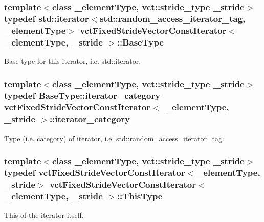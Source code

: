 \subsubsection[{Base\+Type}]{\setlength{\rightskip}{0pt plus 5cm}template$<$class \+\_\+element\+Type, vct\+::stride\+\_\+type \+\_\+stride$>$ typedef std\+::iterator$<$std\+::random\+\_\+access\+\_\+iterator\+\_\+tag, \+\_\+element\+Type$>$ {\bf vct\+Fixed\+Stride\+Vector\+Const\+Iterator}$<$ \+\_\+element\+Type, \+\_\+stride $>$\+::{\bf Base\+Type}}\label{classvct_fixed_stride_vector_const_iterator_ad92100e30e7cbc86c778a0a01a1d19e5}
Base type for this iterator, i.\+e. std\+::iterator. \hypertarget{classvct_fixed_stride_vector_const_iterator_adda9caa49222d747d94b783c74fb95eb}{}
\subsubsection[{iterator\+\_\+category}]{\setlength{\rightskip}{0pt plus 5cm}template$<$class \+\_\+element\+Type, vct\+::stride\+\_\+type \+\_\+stride$>$ typedef Base\+Type\+::iterator\+\_\+category {\bf vct\+Fixed\+Stride\+Vector\+Const\+Iterator}$<$ \+\_\+element\+Type, \+\_\+stride $>$\+::{\bf iterator\+\_\+category}}\label{classvct_fixed_stride_vector_const_iterator_adda9caa49222d747d94b783c74fb95eb}
Type (i.\+e. category) of iterator, i.\+e. std\+::random\+\_\+access\+\_\+iterator\+\_\+tag. \hypertarget{classvct_fixed_stride_vector_const_iterator_ac60fc9d8c2af56a7f251d9a7040efa1e}{}
\subsubsection[{This\+Type}]{\setlength{\rightskip}{0pt plus 5cm}template$<$class \+\_\+element\+Type, vct\+::stride\+\_\+type \+\_\+stride$>$ typedef {\bf vct\+Fixed\+Stride\+Vector\+Const\+Iterator}$<$\+\_\+element\+Type, \+\_\+stride$>$ {\bf vct\+Fixed\+Stride\+Vector\+Const\+Iterator}$<$ \+\_\+element\+Type, \+\_\+stride $>$\+::{\bf This\+Type}}\label{classvct_fixed_stride_vector_const_iterator_ac60fc9d8c2af56a7f251d9a7040efa1e}
This of the iterator itself. 

